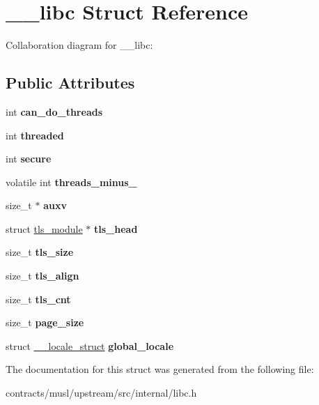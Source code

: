 \hypertarget{struct____libc}{}\section{\+\_\+\+\_\+libc Struct Reference}
\label{struct____libc}


Collaboration diagram for \+\_\+\+\_\+libc\+:
\subsection*{Public Attributes}
\begin{DoxyCompactItemize}
\item 
\mbox{\label{struct____libc_a6f4198c96a131c25ab49e8e0649f8d6c}} 
int {\bfseries can\+\_\+do\+\_\+threads}
\item 
\mbox{\label{struct____libc_aaab3bfcf0de6393e5fb79ea194bc73c0}} 
int {\bfseries threaded}
\item 
\mbox{\label{struct____libc_ab956009a3e650ff8234cad4ff47c8729}} 
int {\bfseries secure}
\item 
\mbox{\label{struct____libc_a805a58c16ce4153c8c9c0289abe6f9da}} 
volatile int {\bfseries threads\+\_\+minus\+\_}
\item 
\mbox{\label{struct____libc_a4bfb6735a3d286447494ab613e566c80}} 
size\+\_\+t $\ast$ {\bfseries auxv}
\item 
\mbox{\label{struct____libc_a4bbc22ee5d4a0768ee829afc8c256c4b}} 
struct \mbox{\hyperlink{structtls__module}{tls\+\_\+module}} $\ast$ {\bfseries tls\+\_\+head}
\item 
\mbox{\label{struct____libc_aac84f4811f17cfdf8bf55fb0c1b67e74}} 
size\+\_\+t {\bfseries tls\+\_\+size}
\item 
\mbox{\label{struct____libc_aacf6b8936ad815b6eec94e0d6d447b42}} 
size\+\_\+t {\bfseries tls\+\_\+align}
\item 
\mbox{\label{struct____libc_abcc225c1672e4dae6784fd0cfae911dd}} 
size\+\_\+t {\bfseries tls\+\_\+cnt}
\item 
\mbox{\label{struct____libc_abe3f0f5de84ca019e1c24f1538bfa099}} 
size\+\_\+t {\bfseries page\+\_\+size}
\item 
\mbox{\label{struct____libc_a93057c0ff4dfa34684778c40fe8b66df}} 
struct \mbox{\hyperlink{struct____locale__struct}{\+\_\+\+\_\+locale\+\_\+struct}} {\bfseries global\+\_\+locale}
\end{DoxyCompactItemize}


The documentation for this struct was generated from the following file\+:\begin{DoxyCompactItemize}
\item 
contracts/musl/upstream/src/internal/libc.\+h\end{DoxyCompactItemize}
